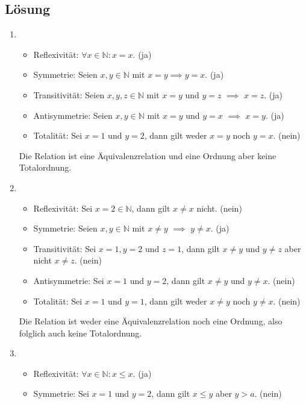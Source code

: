 \documentclass[german,12pt]{homework}
\newcommand{\NN}{\mathbb{N}}
\begin{document}
    \subsection*{Lösung}
    \begin{enumerate}
        \item\ \\
        \begin{itemize}
    		\item Reflexivität: \({\forall}x \in \NN: x = x\). (ja)
    		\item Symmetrie: Seien \(x, y \in \NN\) mit \(x = y \implies y = x\). (ja)
    		\item Transitivität: Seien \(x, y, z \in \NN\) mit \(x = y\) und \(y = z\) \(\implies\) \(x = z\). (ja)
    		\item Antisymmetrie: Seien \(x, y \in \NN\) mit \(x = y\) und \(y = x\) \(\implies\) \(x = y\). (ja)
    		\item Totalität: Sei \(x = 1\) und \(y = 2\), dann gilt weder \(x = y\) noch \(y = x\). (nein)
    	\end{itemize}
    	Die Relation ist eine Äquivalenzrelation und eine Ordnung aber keine Totalordnung.
        \item\ \\
        \begin{itemize}
    		\item Reflexivität: Sei \(x = 2 \in \NN\), dann gilt \(x \ne x\) nicht. (nein)
    		\item Symmetrie: Seien \(x, y \in \NN\) mit \(x \ne y\) \(\implies\) \(y \ne x\). (ja)
    		\item Transitivität: Sei \(x = 1, y = 2\) und \(z = 1\), dann gilt \(x \ne y\) und \(y \ne z\) aber nicht \(x \ne z\). (nein)
    		\item Antisymmetrie: Sei \(x = 1\) und \(y = 2\), dann gilt \(x \ne y\) und \(y \ne x\). (nein)
    		\item Totalität: Sei \(x = 1\) und \(y = 1\), dann gilt weder \(x \ne y\) noch \(y \ne x\). (nein)
    	\end{itemize}
    	Die Relation ist weder eine Äquivalenzrelation noch eine Ordnung, also folglich auch keine Totalordnung.
        \item\ \\
        \begin{itemize}
    		\item Reflexivität: \({\forall}x \in \NN: x \le x\). (ja)
    		\item Symmetrie: Sei \(x = 1\) und \(y = 2\), dann gilt \(x \le y\) aber \(y > a\). (nein)

\end{itemize}
\end{enumerate}
\end{document}
